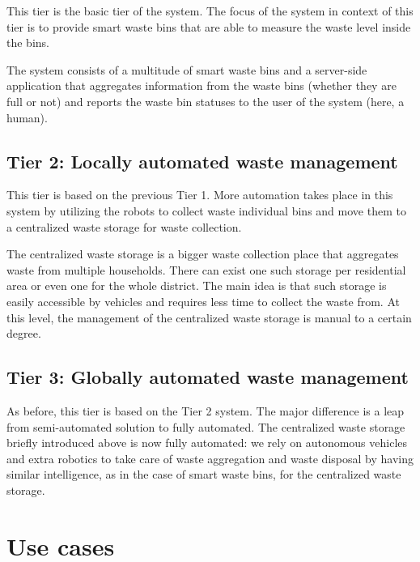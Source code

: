 \documentclass{article}
\begin{document}
This tier is the basic tier of the system. The focus of the system in context of this tier is to
provide smart waste bins that are able to measure the waste level inside the bins.

The system consists of a multitude of smart waste bins and a server-side application that aggregates
information from the waste bins (whether they are full or not) and reports the waste bin statuses to
the user of the system (here, a human).

\subsection{Tier 2: Locally automated waste management}

This tier is based on the previous Tier 1. More automation takes place in this system by utilizing
the robots to collect waste individual bins and move them to a centralized waste storage for waste
collection.

The centralized waste storage is a bigger waste collection place that aggregates waste from multiple
households. There can exist one such storage per residential area or even one for the whole
district. The main idea is that such storage is easily accessible by vehicles and requires less time
to collect the waste from. At this level, the management of the centralized waste storage is manual
to a certain degree.

\subsection{Tier 3: Globally automated waste management}

As before, this tier is based on the Tier 2 system. The major difference is a leap from
semi-automated solution to fully automated. The centralized waste storage briefly introduced above
is now fully automated: we rely on autonomous vehicles and extra robotics to take care of waste
aggregation and waste disposal by having similar intelligence, as in the case of smart waste bins,
for the centralized waste storage.

\section{Use cases}

\end{document}
